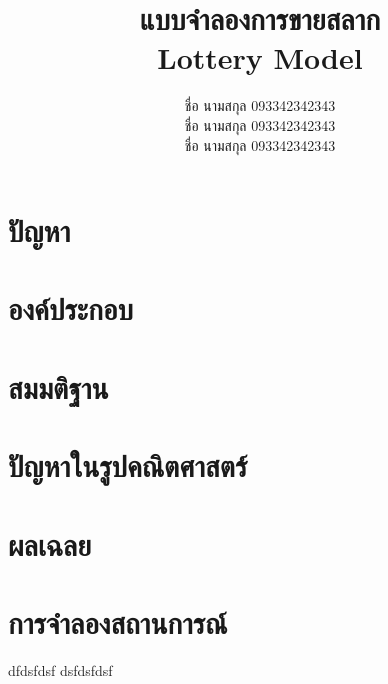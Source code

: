 \documentclass{article}
\title{แบบจำลองการขายสลาก \\ Lottery Model}
\author{ชื่อ นามสกุล 093342342343 \\
		ชื่อ นามสกุล 093342342343 \\
		ชื่อ นามสกุล 093342342343 }
\date{}
\begin{document}
\maketitle


\section{ปัญหา}

\section{องค์ประกอบ}

\section{สมมติฐาน}

\section{ปัญหาในรูปคณิตศาสตร์}

\section{ผลเฉลย}

\section{การจำลองสถานการณ์}

\begin{example}
dfdsfdsf dsfdsfdsf	
\end{example}
\end{document}
